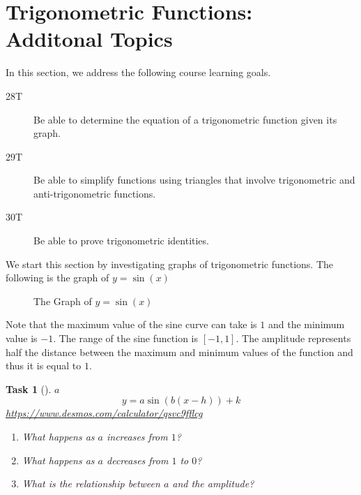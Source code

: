\documentclass[10pt,]{article}
\theoremstyle{plain}
\newtheorem{proposition}[theorem]{Task}
\theoremstyle{definition}
\numberwithin{equation}{section}
\begin{document}
\section[{Trigonometric Functions: Additonal Topics}]{Trigonometric Functions: Additonal Topics}\label{section-trig-adv}
\hypertarget{p-122}{}%
In this section, we address the following course learning goals.%
\leavevmode%
\begin{description}
\item[{28T}]\hypertarget{li-266}{}\hypertarget{p-123}{}%
Be able to determine the equation of a trigonometric function given its graph.%
\item[{29T}]\hypertarget{li-267}{}\hypertarget{p-124}{}%
Be able to simplify functions using triangles that involve trigonometric and anti-trigonometric functions.%
\item[{30T}]\hypertarget{li-268}{}\hypertarget{p-125}{}%
Be able to prove trigonometric identities.%
\end{description}
\hypertarget{p-126}{}%
We start this section by investigating graphs of trigonometric functions. The following is the graph of \(y=\sin(x)\)%
\begin{figure}
\centering
{
}
\caption{The Graph of \(y=\sin(x)\)\label{graph-sin}}
\end{figure}
\hypertarget{p-127}{}%
Note that the maximum value of the sine curve can take is \(1\) and the minimum value is \(-1\). The range of the sine function is \([-1,1]\). The amplitude represents half the distance between the maximum and minimum values of the function and thus it is equal to \(1\).%
\begin{proposition}[{}]\label{proposition-60}
\(a\)%
\begin{equation*}
y=a\sin(b(x-h))+k
\end{equation*}
\href{https://www.desmos.com/calculator/qsvc9fflcg}{https://www.desmos.com/calculator/qsvc9fflcg}\leavevmode%
\begin{enumerate}
\item\hypertarget{li-269}{}What happens as \(a\) increases from \(1\)?%
\item\hypertarget{li-270}{}What happens as \(a\) decreases from \(1\) to \(0\)?%
\item\hypertarget{li-271}{}What is the relationship between \(a\) and the amplitude?%
\end{enumerate}
\end{proposition}
\end{document}
